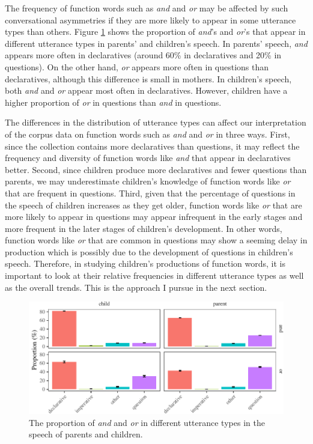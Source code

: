 \documentclass[,man,floatsintext]{apa6}
\begin{document}
The frequency of function words such as \emph{and} and \emph{or} may be affected by such conversational asymmetries if they are more likely to appear in some utterance types than others. Figure \ref{fig:CnctPropbySpeechAct} shows the proportion of \emph{and}'s and \emph{or}'s that appear in different utterance types in parents' and children's speech. In parents' speech, \emph{and} appears more often in declaratives (around 60\% in declaratives and 20\% in questions). On the other hand, \emph{or} appears more often in questions than declaratives, although this difference is small in mothers. In children's speech, both \emph{and} and \emph{or} appear most often in declaratives. However, children have a higher proportion of \emph{or} in questions than \emph{and} in questions.

The differences in the distribution of utterance types can affect our interpretation of the corpus data on function words such as \emph{and} and \emph{or} in three ways. First, since the collection contains more declaratives than questions, it may reflect the frequency and diversity of function words like \emph{and} that appear in declaratives better. Second, since children produce more declaratives and fewer questions than parents, we may underestimate children's knowledge of function words like \emph{or} that are frequent in questions. Third, given that the percentage of questions in the speech of children increases as they get older, function words like \emph{or} that are more likely to appear in questions may appear infrequent in the early stages and more frequent in the later stages of children's development. In other words, function words like \emph{or} that are common in questions may show a seeming delay in production which is possibly due to the development of questions in children's speech. Therefore, in studying children's productions of function words, it is important to look at their relative frequencies in different utterance types as well as the overall trends. This is the approach I pursue in the next section.

\begin{figure}[tb]

{\centering \includegraphics{figs/CnctPropbySpeechAct-1} 

}

\caption{The proportion of \textit{and} and \textit{or} in different utterance types in the speech of parents and children.}\label{fig:CnctPropbySpeechAct}
\end{figure}
\end{document}

